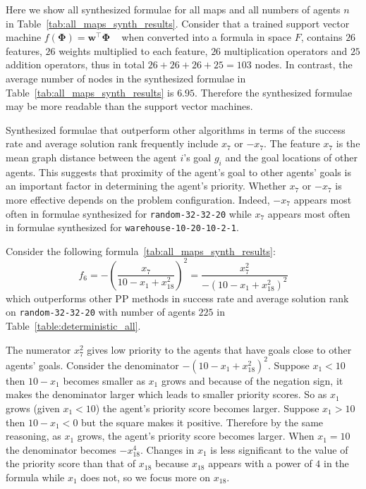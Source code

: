 \documentclass[letterpaper]{article}
\begin{document}
Here we show all synthesized formulae for all maps and all numbers of agents $ n $ in Table~\ref{tab:all_maps_synth_results}. Consider that a trained support vector machine $ f(\mathbf{\Phi}) = \mathbf{w}^\intercal \mathbf{\Phi} $ ~\citep{zhang2022learning} when converted into a formula in space $ F $, contains $ 26 $ features, $ 26 $ weights multiplied to each feature, $ 26 $ multiplication operators and $ 25 $ addition operators, thus in total $ 26 + 26 + 26 + 25 = 103 $ nodes. In contrast, the average number of nodes in the synthesized formulae in Table~\ref{tab:all_maps_synth_results} is $ 6.95 $. Therefore the synthesized formulae may be more readable than the support vector machines.

Synthesized formulae that outperform other algorithms in terms of the success rate and average solution rank frequently include $ x_7 $ or $ -x_{7} $. The feature $ x_7 $ is the mean graph distance between the agent $ i $'s goal $ g_i $ and the goal locations of other agents. This suggests that proximity of the agent's goal to other agents' goals is an important factor in determining the agent's priority. Whether $ x_7 $ or $ -x_7 $ is more effective depends on the problem configuration. Indeed, $ -x_7 $ appears most often in formulae synthesized for {\tt random-32-32-20} while $ x_7 $ appears most often in formulae synthesized for {\tt warehouse-10-20-10-2-1}.

Consider the following formula~\ref{tab:all_maps_synth_results}: $$ f_{6} =-\left(\frac{x_{7}}{10 - x_{1} + x_{18}^2}\right)^2 = \frac{x_{7}^2}{-(10 - x_{1} + x_{18}^2)^2} $$ which outperforms other PP methods in success rate and average solution rank on {\tt random-32-32-20} with number of agents $ 225 $ in Table~\ref{table:deterministic_all}.

The numerator $ x_7^2 $ gives low priority to the agents that have goals close to other agents' goals. Consider the denominator $ -(10 - x_{1} + x_{18}^2)^2 $. Suppose $ x_{1} < 10 $ then $ 10 - x_1 $ becomes smaller as $ x_1 $ grows and because of the negation sign, it makes the denominator larger which leads to smaller priority scores. So as $ x_1 $ grows (given $ x_1 < 10 $) the agent's priority score becomes larger. Suppose $ x_1 > 10 $ then $ 10 - x_1 < 0 $ but the square makes it positive. Therefore by the same reasoning, as $ x_1 $ grows, the agent's priority score becomes larger. When $ x_1 = 10 $ the denominator becomes $ -x_{18}^4 $. Changes in $ x_1 $ is less significant to the value of the priority score than that of $ x_{18} $ because $ x_{18} $ appears with a power of $ 4 $ in the formula while $ x_1 $ does not, so we focus more on $ x_{18} $.
\end{document}
